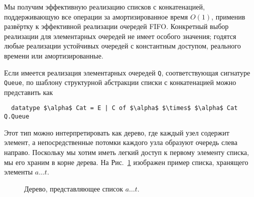 Мы получим эффективную реализацию списков с конкатенацией,
поддерживающую все операции за амортизированное время $O(1)$, применив
развёртку к эффективной реализации очередей FIFO. Конкретный выбор
реализации для элементарных очередей не имеет особого значения;
годятся любые реализации устойчивых очередей с константным доступом,
реального времени или амортизированные.

Если имеется реализация элементарных очередей \lstinline!Q!,
соответствующая сигнатуре \lstinline!Queue!, по шаблону
структурной абстракции списки с конкатенацией можно представить как
\begin{lstlisting}
  datatype $\alpha$ Cat = E | C of $\alpha$ $\times$ $\alpha$ Cat Q.Queue
\end{lstlisting}
Этот тип можно интерпретировать как дерево, где каждый узел содержит
элемент, а непосредственные потомки каждого узла образуют очередь
слева направо.  Поскольку мы хотим иметь легкий доступ к первому
элементу списка, мы его храним в корне дерева. На Рис.~\ref{fig:10.4}
изображен пример списка, хранящего элементы $a \ldots t$.

\begin{figure}
  \centering
  
  \caption{Дерево, представляющее список $a \ldots t$.}
  \label{fig:10.4}
\end{figure}

